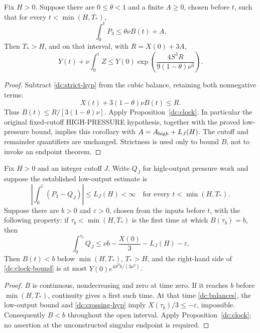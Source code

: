 \begin{corollary}
\label{dc:strict}
Fix $H>0$.  Suppose there are $0\le\theta<1$ and a finite $A\ge0$, chosen
before $t$, such that for every $t<\min(H,T_*)$,
\begin{equation}\label{dc:strict-hyp}
 \int_0^tP_3\le\theta\nu B(t)+A.
\end{equation}
Then $T_*>H$, and on that interval, with $R=X(0)+3A$,
\begin{equation}\label{dc:strict-bound}
 Y(t)+\nu\int_0^tZ
 \le Y(0)\exp\!\left(\frac{4S^3R}{9(1-\theta)\nu^3}\right).
\end{equation}
\end{corollary}
\begin{proof}
Subtract \eqref{dc:strict-hyp} from the cubic balance, retaining both
nonnegative terms:
\[
 X(t)+3(1-\theta)\nu B(t)\le R.
\]
Thus $B(t)\le R/[3(1-\theta)\nu]$.  Apply
Proposition~\ref{dc:clock}.  In particular the original fixed-cutoff
HIGH-PRESSURE hypothesis, together with the proved low-pressure bound,
implies this corollary with $A=A_{\rm high}+L_J(H)$.  The cutoff and
remainder quantifiers are unchanged.  Strictness is used only to bound
$B$, not to invoke an endpoint theorem.
\end{proof}

\begin{theorem}
\label{dc:barrier}
Fix $H>0$ and an integer cutoff $J$.  Write $Q_J$ for high-output pressure
work and suppose the established low-output estimate is
\[
 \left|\int_0^t(P_3-Q_J)\right|\le L_J(H)<\infty
 \quad\text{for every }t<\min(H,T_*).
\]
Suppose there are $b>0$ and $\varepsilon>0$, chosen from the inputs before
$t$, with the following property: if $\tau_b<\min(H,T_*)$ is the first
time at which $B(\tau_b)=b$, then
\begin{equation}\label{dc:crossing-hyp}
 \int_0^{\tau_b}Q_J
 \le\nu b-\frac{X(0)}3-L_J(H)-\varepsilon.
\end{equation}
Then $B(t)<b$ below $\min(H,T_*)$, $T_*>H$, and the right-hand side of
\eqref{dc:clock-bound} is at most $Y(0)e^{4S^3b/(3\nu^2)}$.
\end{theorem}
\begin{proof}
$B$ is continuous, nondecreasing and zero at time zero.  If it reaches
$b$ before $\min(H,T_*)$, continuity gives a first such time.  At that
time \eqref{dc:balances}, the low-output bound and
\eqref{dc:crossing-hyp} imply $X(\tau_b)/3\le-\varepsilon$, impossible.
Consequently $B<b$ throughout the open interval.  Apply
Proposition~\ref{dc:clock}; no assertion at the unconstructed singular
endpoint is required.
\end{proof}


